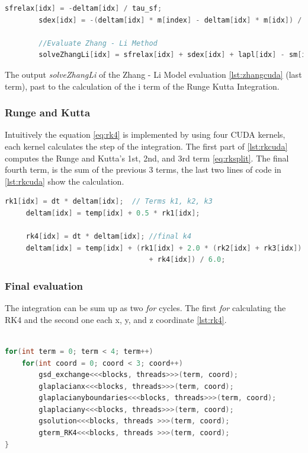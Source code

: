 \begin{lstlisting}[language=C++, label={lst:zhangcuda}, caption={Runge and Kutta 4th Terms}]
		sfrelax[idx] = -deltam[idx] / tau_sf;
		sdex[idx] = -(deltam[idx] * m[index] - deltam[idx] * m[idx]) / tau_sd;
		
		//Evaluate Zhang - Li Method
        solveZhangLi[idx] = sfrelax[idx] + sdex[idx] + lapl[idx] - sm[idx];
\end{lstlisting}

The output  \textit{solveZhangLi} of the Zhang - Li Model evaluation \ref{lst:zhangcuda}  (last term), past to the calculation of the i term of the Runge Kutta Integration.

\subsubsection{Runge and Kutta}
 
Intuitively the equation \ref{eq:rk4} is implemented by using four CUDA kernels, each kernel calculates the step of the integration. The first part of \ref{lst:rkcuda} computes the Runge and Kutta's 1st, 2nd, and 3rd  term \ref{eq:rksplit}. The final fourth term, is the sum of the previous 3 terms, the last two lines of code in \ref{lst:rkcuda} show the calculation.

\begin{lstlisting}[language=C++, label={lst:rkcuda}, caption={Runge and Kutta 4th Terms}]
     rk1[idx] = dt * deltam[idx];  // Terms k1, k2, k3
     deltam[idx] = temp[idx] + 0.5 * rk1[idx];
     
     rk4[idx] = dt * deltam[idx]; //final k4
     deltam[idx] = temp[idx] + (rk1[idx] + 2.0 * (rk2[idx] + rk3[idx])
                                  + rk4[idx]) / 6.0;
\end{lstlisting}


\subsubsection{Final evaluation}

The integration can be sum up as two \textit{for} cycles. The first \textit{for} calculating the RK4 and the second one each x, y, and z coordinate \ref{lst:rk4}.

\begin{lstlisting}[language=C++, label={lst:rk4}, caption={Summarize of Runge and Kutta 4th Integration}]	

for(int term = 0; term < 4; term++)
	for(int coord = 0; coord < 3; coord++)
    	gsd_exchange<<<blocks, threads>>>(term, coord);
    	glaplacianx<<<blocks, threads>>>(term, coord);
    	glaplacianyboundaries<<<blocks, threads>>>(term, coord);
    	glaplaciany<<<blocks, threads>>>(term, coord);
    	gsolution<<<blocks, threads >>>(term, coord);
    	gterm_RK4<<<blocks, threads >>>(term, coord);
}
\end{lstlisting}



